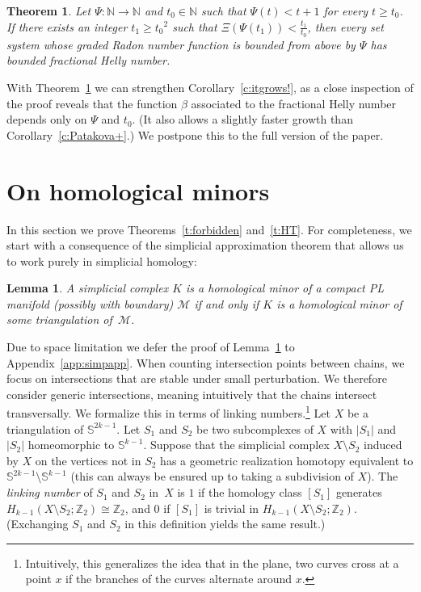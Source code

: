 \documentclass[11pt]{article}
\newcommand{\Z}{\mathbb{Z}}
\newcommand{\N}{\mathbb{N}}
\newcommand{\s}{\mathbb{S}}
\newcommand{\M}{\mathcal{M}}
\newcommand{\defn}[1]{\emph{\color{violet}#1}}
\newcommand{\pth}[1]{\left(#1\right)}
\newtheorem{theorem}{Theorem}
\newtheorem{lemma}{Lemma}[section]
\begin{document}
%
\begin{theorem}\label{t:radgrowth2}
  Let $\Psi: \N\rightarrow \N$ and $t_0 \in \N$ such that $\Psi(t) < t+1$ for every $t \ge t_0$. If there exists an integer $t_1 \ge {t_0}^2$ such that $\Xi\pth{\Psi(t_1)} < \frac{t_1}{t_0}$, then every set system whose graded Radon number function is bounded from above by $\Psi$ has bounded fractional Helly number.
\end{theorem}
%
\noindent
With Theorem~\ref{t:radgrowth2} we can strengthen Corollary~\ref{c:itgrows!}, as a close inspection of the proof reveals that the function $\beta$ associated to the fractional Helly number depends only on $\Psi$ and $t_0$. (It also allows a slightly faster growth than Corollary~\ref{c:Patakova+}.) We postpone this to the full version of the paper.
%
%
\section{On homological minors}\label{s:toolbox}\label{s:back}
%
In this section we prove Theorems~\ref{t:forbidden} and~\ref{t:HT}. For completeness, we start with a consequence of the simplicial approximation theorem that allows us to work purely in simplicial homology:
%
\begin{lemma}\label{l:going-generic-simplicial}
  A simplicial complex $K$ is a homological minor of a compact PL manifold (possibly with boundary) $\M$ if and only if $K$ is a homological minor of some triangulation of~$\M$.
\end{lemma}
%
\noindent
Due to space limitation we defer the proof of Lemma~\ref{l:going-generic-simplicial} to Appendix~\ref{app:simpapp}.
%
\medskip
%
When counting intersection points between chains, we focus on intersections that are stable under small perturbation. We therefore consider generic intersections, meaning intuitively that the chains intersect transversally. We formalize this in terms of linking numbers.\footnote{Intuitively, this generalizes the idea that in the plane, two curves cross at a point $x$ if the branches of the curves alternate around $x$.}
%
\medskip
%
Let $X$ be a triangulation of $\s^{2k-1}$. Let $S_1$ and $S_2$ be two subcomplexes of $X$ with $|S_1|$ and $|S_2|$ homeomorphic to $\s^{k-1}$. Suppose that the simplicial complex $X \setminus S_2$ induced by $X$ on the vertices not in $S_2$ has a geometric realization homotopy equivalent to $\s^{2k-1}\setminus \s^{k-1}$ (this can always be ensured up to taking a subdivision of $X$). The \defn{linking number} of $S_1$ and $S_2$ in~$X$ is $1$ if the homology class $[S_1]$ generates $H_{k-1}(X\setminus S_2;\Z_2)\cong\Z_2$, and $0$ if $[S_1]$ is trivial in $H_{k-1}(X\setminus S_2;\Z_2)$. (Exchanging $S_1$ and $S_2$ in this definition yields the same result.)
\end{document}
